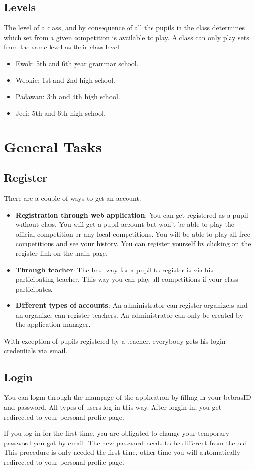 \documentclass[11pt,a4paper]{report}
\begin{document}
\subsection{Levels}
The level of a class, and by consequence of all the pupils in the class determines which set from a given competition is available to play. A class can only play sets from the same level as their class level.
\begin{itemize}
\item Ewok: 5th and 6th year grammar school.
\item Wookie: 1st and 2nd high school.
\item Padawan: 3th and 4th high school.
\item Jedi: 5th and 6th high school.
\end{itemize}



\section{General Tasks}

\subsection{Register}
There are a couple of ways to get an account.
\begin{itemize}
\item \textbf {Registration through web application}: You can get registered as a pupil without class. You will get a pupil account but won't be able to play the official competition or any local competitions. You will be able to play all free competitions and see your history. You can register yourself by clicking on the register link on the main page.
\item \textbf{Through teacher}: The best way for a pupil to register is via his participating teacher. This way you can play all competitions if your class participates.
\item \textbf{Different types of accounts}: An administrator can register organizers and an organizer can register teachers. An administrator can only be created by the application manager.
\end{itemize}
With exception of pupils registered by a teacher, everybody gets his login credentials via email. 

\subsection{Login}
You can login through the mainpage of the application by filling in your bebrasID and password. All types of users log in this way. After loggin in, you get redirected to your personal profile page. 
\par
If you log in for the first time, you are obligated to change your temporary password you got by email. The new password needs to be different from the old. This procedure is only needed the first time, other time you will automatically redirected to your personal profile page.
\end{document}
